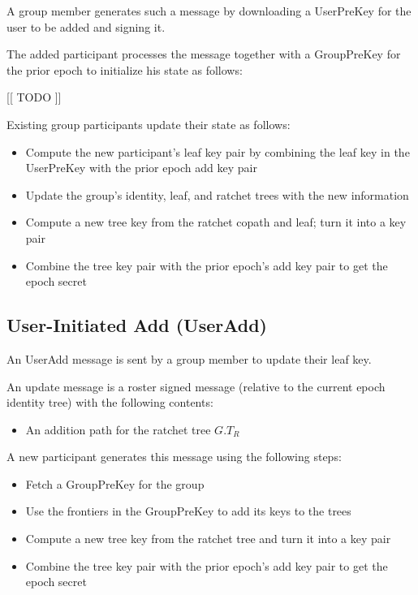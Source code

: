 \documentclass[11pt, oneside]{article}
\begin{document}
A group member generates such a message by downloading a UserPreKey for the user to be added and signing it.

The added participant processes the message together with a GroupPreKey for the prior epoch to initialize his state as follows:

[[ TODO ]]

Existing group participants update their state as follows:

\begin{itemize}
\item{Compute the new participant's leaf key pair by combining the leaf key in the UserPreKey with the prior epoch add key pair}
\item{Update the group's identity, leaf, and ratchet trees with the new information}
\item{Compute a new tree key from the ratchet copath and leaf; turn it into a key pair}
\item{Combine the tree key pair with the prior epoch's add key pair to get the epoch secret}
\end{itemize}


\subsection{User-Initiated Add (UserAdd)}

An UserAdd message is sent by a group member to update their leaf key.  

An update message is a roster signed message (relative to the current epoch identity tree) with the following contents:

\begin{itemize}
\item{An addition path for the ratchet tree $G.T_R$}
\end{itemize}

A new participant generates this message using the following steps:

\begin{itemize}
\item{Fetch a GroupPreKey for the group}
\item{Use the frontiers in the GroupPreKey to add its keys to the trees}
\item{Compute a new tree key from the ratchet tree and turn it into a key pair}
\item{Combine the tree key pair with the prior epoch's add key pair to get the epoch secret}
\end{itemize}
\end{document}
